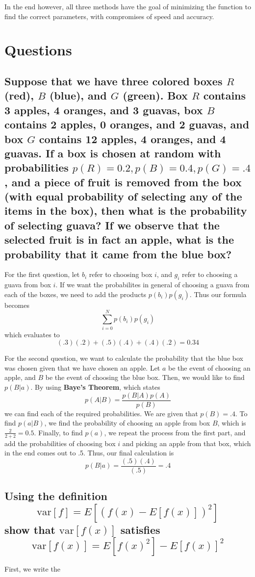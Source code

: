 \documentclass{article}
\begin{document}
				In the end however, all three methods have the goal of minimizing the function to find the 
				correct parameters, with compromises of speed and accuracy.


\section{Questions}


		\subsection{Suppose that we have three colored boxes $R$ (red), $B$ (blue),
				and $G$ (green). Box $R$ contains 3 apples, 4 oranges, and 3 guavas,
				box $B$ contains 2 apples, 0 oranges, and 2 guavas, and box $G$ contains
				12 apples, 4 oranges, and 4 guavas. If a box is chosen at random with 
				probabilities $p(R)=0.2,p(B)=0.4,p(G)=.4$, and a piece of fruit is removed
				from the box (with equal probability of selecting any of the items in the box),
				then what is the probability of selecting guava? If we observe that the selected
				fruit is in fact an apple, what is the probability that it came from the blue box?}

		For the first question, let $b_{i}$ refer to choosing box $i$, and $g_{i}$ refer 
		to choosing a guava from box $i$. If we want the probabilites in general of choosing
		a guava from each of the boxes, we need to add the products $p(b_{i})p(g_{i})$. Thus 
		our formula becomes 
				\[ \sum_{i=0}^{N}p(b_{i})p(g_{i})\]
		which evaluates to 
				\[(.3)(.2) + (.5)(.4) + (.4)(.2) = 0.34\]
		
		For the second question, we want to calculate the probability that the blue box was chosen
		given that we have chosen an apple. Let $a$ be the event of choosing an apple, and $B$ be
		the event of choosing the blue box. Then, we would like to find $p(B|a)$. By using
		\textbf{Baye's Theorem}, which states
		\[ p(A|B) = \frac{p(B|A)p(A)}{p(B)}\]
		we can find each of the required probabilities. We are given that $p(B) = .4$. To find
		$p(a|B)$, we find the probability of choosing an apple from box $B$, which is 
		$\frac{2}{2+2} = 0.5$. Finally, to find $p(a)$, we repeat the process from the first part,
		and add the probabilities of choosing box $i$ and picking an apple from that box, which in the
		end comes out to .5. Thus, our final calculation is 
				\[ p(B|a) = \frac{(.5)(.4)}{(.5)} = .4\]


		\subsection{Using the definition \[\textrm{var}[f] = E[(f(x) - E[f(x)])^{2}] \]
		 show that $\textrm{var}[f(x)]$ satisfies
		\[\textrm{var}[f(x)] = E[f(x)^{2}] - E[f(x)]^{2}\]}
		
		First, we write the 
\end{document}
